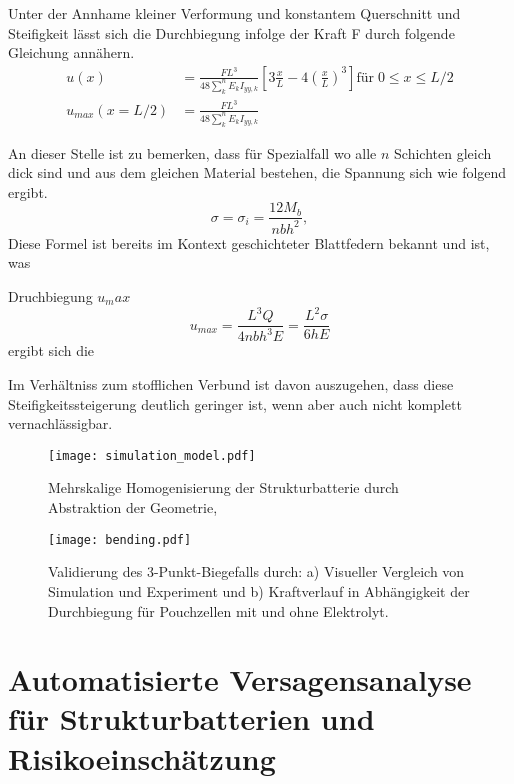Unter der Annhame kleiner Verformung und konstantem Querschnitt und Steifigkeit lässt sich die Durchbiegung infolge der Kraft F durch folgende Gleichung annähern.
\begin{align}
    u(x) &= \frac{F L^3}{48 \sum_{k}^{n} E_k I_{yy,k}} \left[ 3 \frac{x}{L} - 4\left(\frac{x}{L}\right)^3 \right] \text{für} \; 0 \leq x \leq L/2 \\
    u_{max} (x = L/2) &= \frac{FL^3}{48 \sum_{k}^{n} E_k I_{yy,k}} 
\end{align}



An dieser Stelle ist zu bemerken, dass für Spezialfall wo alle $n$ Schichten gleich dick sind und aus dem gleichen Material bestehen, die Spannung sich wie folgend ergibt.
\begin{equation}
    \sigma = \sigma_i = \frac{12 M_{b}}{n b h^2},
\end{equation}
Diese Formel ist bereits im Kontext geschichteter Blattfedern bekannt und ist, was 

Druchbiegung $u_max$
\begin{equation}
    u_{max} = \frac{L^3 Q}{4 n b h^3 E} = \frac{L^2 \sigma}{6 h E}
\end{equation}
ergibt sich die 


Im Verhältniss zum stofflichen Verbund ist davon auszugehen, dass diese Steifigkeitssteigerung deutlich geringer ist, wenn aber auch nicht komplett vernachlässigbar.

\begin{figure}[!h]
        \center
		\texttt{[image: simulation\_model.pdf]}
		\caption{\label{fig:homogenisation}Mehrskalige Homogenisierung der Strukturbatterie durch Abstraktion der Geometrie, }
\end{figure}

\begin{figure}[!h]
        \center
		\texttt{[image: bending.pdf]}
		\caption{\label{fig:bending}Validierung des 3-Punkt-Biegefalls durch: a) Visueller Vergleich von Simulation und Experiment und b) Kraftverlauf in Abhängigkeit der Durchbiegung für Pouchzellen mit und ohne Elektrolyt.}
\end{figure}


\section{\label{sec:automated_failure}Automatisierte Versagensanalyse für Strukturbatterien und Risikoeinschätzung}

